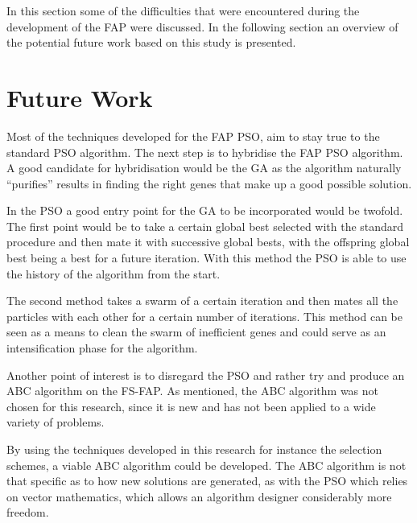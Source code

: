 In this section some of the difficulties that were encountered during the development of the FAP were discussed. In the following section an overview of the potential future work based on this study is presented.
\section{Future Work}
Most of the techniques developed for the FAP PSO, aim to stay true to the standard PSO algorithm. The next step is to hybridise the FAP PSO algorithm. A good candidate for hybridisation would be the GA as the algorithm naturally ``purifies'' results in finding the right genes that make up a good possible solution.

In the PSO a good entry point for the GA to be incorporated would be twofold. The first point would be to take a certain global best selected with the standard procedure and then mate it with successive global bests, with the offspring global best being a best for a future iteration. With this method the PSO is able to use the history of the algorithm from the start.

The second method takes a swarm of a certain iteration and then mates all the particles with each other for a certain number of iterations. This method can be seen as a means to clean the swarm of inefficient genes and could serve as an intensification phase for the algorithm.

Another point of interest is to disregard the PSO and rather try and produce an ABC algorithm on the FS-FAP. As mentioned, the ABC algorithm was not chosen for this research, since it is new and has not been applied to a wide variety of problems. 

By using the techniques developed in this research for instance the selection schemes, a viable ABC algorithm could be developed. The ABC algorithm is not that specific as to how new solutions are generated, as with the PSO which relies on vector mathematics, which allows an algorithm designer considerably more freedom.





